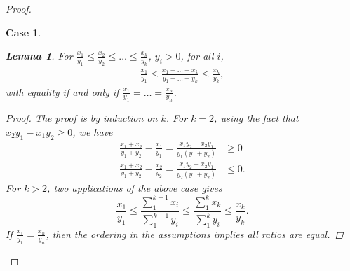 \documentclass{article}
\newtheorem{lemma}{Lemma}
\theoremstyle{case}
\newtheorem{case}{Case}
\begin{document}
\begin{proof}
\begin{case}
\begin{lemma}
For $\frac{x_1}{y_1} \leq \frac{x_2}{y_2} \leq \dots \leq \frac{x_k}{y_k}$, $y_i > 0$, for all $i$,
\begin{align*}
\frac{x_1}{y_1} \leq \frac{x_1 + \dots + x_k}{y_1 + \dots + y_k} \leq \frac{x_k}{y_k},
\end{align*}
with equality if and only if $\frac{x_1}{y_1} = \dots = \frac{x_n}{y_n}$.
\end{lemma}
\begin{proof}
The proof is by induction on $k$. For $k=2$, using the fact that $x_2y_1 - x_1y_2 \geq 0$, we have
\begin{align*}
\frac{x_1+x_2}{y_1+y_2} - \frac{x_1}{y_1} = \frac{x_1y_2 - x_2y_1}{y_1\left( y_1 + y_2\right)} &\geq 0 \\
\frac{x_1 + x_2}{y_1 + y_2} - \frac{x_2}{y_2} = \frac{x_1y_2 - x_2y_1}{y_2\left( y_1 + y_2\right)} &\leq 0.
\end{align*}
For $k > 2$, two applications of the above case gives
\[
\frac{x_1}{y_1} \leq \frac{\sum_1^{k-1} x_i}{\sum_1^{k-1} y_i} \leq \frac{\sum_1^k x_k}{\sum_1^k y_i} \leq \frac{x_k}{y_k}. 
\]
If $\frac{x_1}{y_1} = \frac{x_n}{y_n}$, then the ordering in the assumptions implies all ratios are equal. 
\end{proof}


\end{case}
\end{proof}
\end{document}
